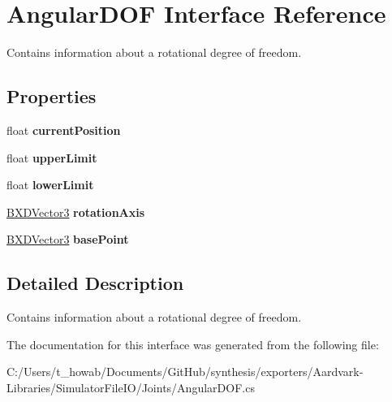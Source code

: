 \hypertarget{interface_angular_d_o_f}{}\section{Angular\+D\+OF Interface Reference}
\label{interface_angular_d_o_f}


Contains information about a rotational degree of freedom.  


\subsection*{Properties}
\begin{DoxyCompactItemize}
\item 
\mbox{\label{interface_angular_d_o_f_a434a3c6ec14837a8f3d3ac7f22ce4bff}} 
float {\bfseries current\+Position}
\item 
\mbox{\label{interface_angular_d_o_f_aafedcc9484711a3246b4d362c8f48fed}} 
float {\bfseries upper\+Limit}
\item 
\mbox{\label{interface_angular_d_o_f_a0e36ac10b1cfb2126dd447825d0d78bd}} 
float {\bfseries lower\+Limit}
\item 
\mbox{\label{interface_angular_d_o_f_ad64f9f78e32fba7d68ba0b92c4030394}} 
\hyperlink{class_b_x_d_vector3}{B\+X\+D\+Vector3} {\bfseries rotation\+Axis}
\item 
\mbox{\label{interface_angular_d_o_f_ae2866b40f5485cc31480337e0905aacd}} 
\hyperlink{class_b_x_d_vector3}{B\+X\+D\+Vector3} {\bfseries base\+Point}
\end{DoxyCompactItemize}


\subsection{Detailed Description}
Contains information about a rotational degree of freedom. 



The documentation for this interface was generated from the following file\+:\begin{DoxyCompactItemize}
\item 
C\+:/\+Users/t\+\_\+howab/\+Documents/\+Git\+Hub/synthesis/exporters/\+Aardvark-\/\+Libraries/\+Simulator\+File\+I\+O/\+Joints/Angular\+D\+O\+F.\+cs\end{DoxyCompactItemize}
